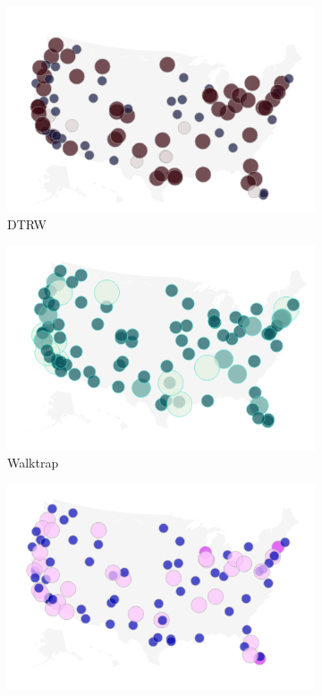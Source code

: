 \documentclass[12pt,a4paper]{article}
\begin{document}
\begin{figure}[H]
  \centering
  \begin{subfigure}[b]{0.5\textwidth}
    \centering
    \includegraphics[width=\textwidth]{flight_net/map_DTRW.png}
    \caption{DTRW}
    \label{fig:map_DTRW}
  \end{subfigure}
  \hfill
  \begin{subfigure}[b]{0.5\textwidth}
    \centering
    \includegraphics[width=\textwidth]{flight_net/map_wt.png}
    \caption{Walktrap}
    \label{fig:map_wt}
  \end{subfigure}
  \hfill
  \begin{subfigure}[b]{0.5\textwidth}
    \centering
    \includegraphics[width=\textwidth]{flight_net/map_dynsim.png}

\end{subfigure}
\end{figure}
\end{document}
